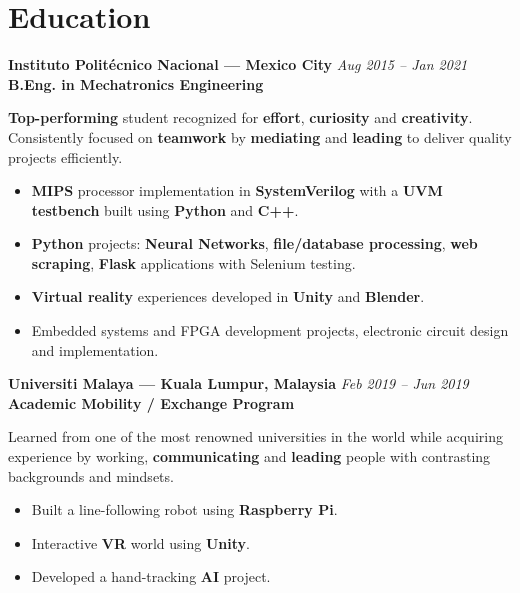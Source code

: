 \documentclass[10.5pt,a4paper]{article}
\newcommand{\entryheader}[3]{%
  {\large\bfseries\color{darkgray} #1} \hfill {\small\color{midgray}\itshape #3}\\[1pt]
  {\bfseries\color{accent2} #2}\par\vspace{2pt}
}
\begin{document}
\section*{Education}

\entryheader{Instituto Polit\'ecnico Nacional --- Mexico City}{B.Eng. in Mechatronics Engineering}{Aug 2015 -- Jan 2021}
\textbf{Top-performing} student recognized for \textbf{effort}, \textbf{curiosity} and \textbf{creativity}. Consistently focused on \textbf{teamwork} by \textbf{mediating} and \textbf{leading} to deliver quality projects efficiently.
\begin{itemize}
  \item \textbf{MIPS} processor implementation in \textbf{SystemVerilog} with a \textbf{UVM testbench} built using \textbf{Python} and \textbf{C++}. \\
  \item \textbf{Python} projects: \textbf{Neural Networks}, \textbf{file/database processing}, \textbf{web scraping}, \textbf{Flask} applications with Selenium testing. \\
  \item \textbf{Virtual reality} experiences developed in \textbf{Unity} and \textbf{Blender}. \\
  \item Embedded systems and FPGA development projects, electronic circuit design and implementation. \\
\end{itemize}

\entryheader{Universiti Malaya --- Kuala Lumpur, Malaysia}{Academic Mobility / Exchange Program}{Feb 2019 -- Jun 2019}
Learned from one of the most renowned universities in the world while acquiring experience by working, \textbf{communicating} and \textbf{leading} people with contrasting backgrounds and mindsets.
\begin{itemize}
  \item Built a line-following robot using \textbf{Raspberry Pi}. \\
  \item Interactive \textbf{VR} world using \textbf{Unity}. \\
  \item Developed a hand-tracking \textbf{AI} project. \\
\end{itemize}
\end{document}
